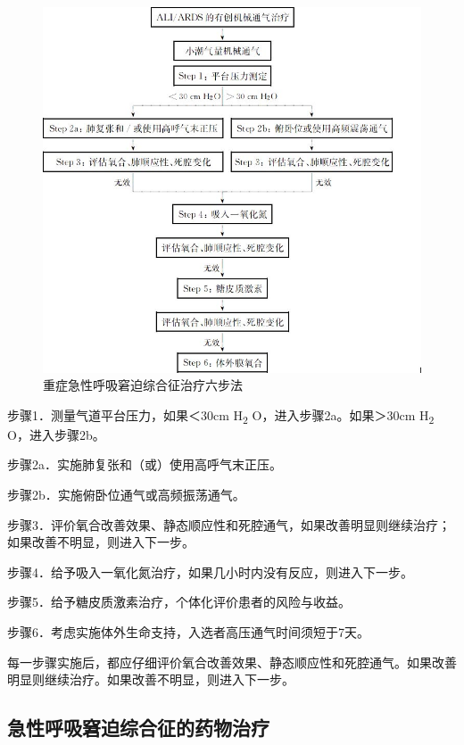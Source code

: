 \begin{figure}[!htbp]
 \centering
 \includegraphics{./images/Image00053.jpg}
 \captionsetup{justification=centering}
 \caption{重症急性呼吸窘迫综合征治疗六步法}
 \label{fig5-4}
  \end{figure} 

步骤1．测量气道平台压力，如果＜30cm H\textsubscript{2}
O，进入步骤2a。如果＞30cm H\textsubscript{2} O，进入步骤2b。

步骤2a．实施肺复张和（或）使用高呼气末正压。

步骤2b．实施俯卧位通气或高频振荡通气。

步骤3．评价氧合改善效果、静态顺应性和死腔通气，如果改善明显则继续治疗；如果改善不明显，则进入下一步。

步骤4．给予吸入一氧化氮治疗，如果几小时内没有反应，则进入下一步。

步骤5．给予糖皮质激素治疗，个体化评价患者的风险与收益。

步骤6．考虑实施体外生命支持，入选者高压通气时间须短于7天。

每一步骤实施后，都应仔细评价氧合改善效果、静态顺应性和死腔通气。如果改善明显则继续治疗。如果改善不明显，则进入下一步。

\subsection{急性呼吸窘迫综合征的药物治疗}

